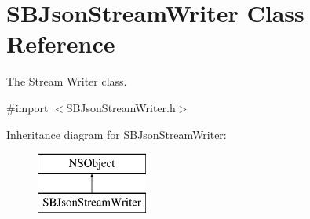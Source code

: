 \hypertarget{interface_s_b_json_stream_writer}{\section{S\-B\-Json\-Stream\-Writer Class Reference}
\label{interface_s_b_json_stream_writer}
}


The Stream Writer class.  




{\ttfamily \#import $<$S\-B\-Json\-Stream\-Writer.\-h$>$}

Inheritance diagram for S\-B\-Json\-Stream\-Writer\-:\begin{figure}[H]
\begin{center}
\leavevmode
\includegraphics[height=2.000000cm]{interface_s_b_json_stream_writer}
\end{center}
\end{figure}

